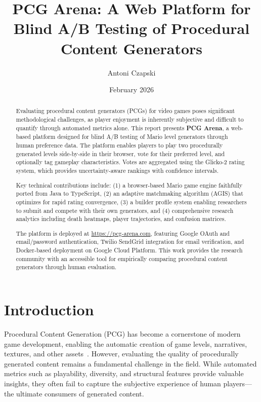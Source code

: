 \documentclass[11pt,a4paper]{article}
\title{PCG Arena: A Web Platform for Blind A/B Testing of Procedural Content Generators}
\author{Antoni Czapski}
\date{February 2026}
\theoremstyle{plain}
\theoremstyle{definition}
\theoremstyle{remark}
\begin{document}
\maketitle

\begin{abstract}
Evaluating procedural content generators (PCGs) for video games poses significant methodological challenges, as player enjoyment is inherently subjective and difficult to quantify through automated metrics alone. This report presents \textbf{PCG Arena}, a web-based platform designed for blind A/B testing of Mario level generators through human preference data. The platform enables players to play two procedurally generated levels side-by-side in their browser, vote for their preferred level, and optionally tag gameplay characteristics. Votes are aggregated using the Glicko-2 rating system, which provides uncertainty-aware rankings with confidence intervals.

Key technical contributions include: (1) a browser-based Mario game engine faithfully ported from Java to TypeScript, (2) an adaptive matchmaking algorithm (AGIS) that optimizes for rapid rating convergence, (3) a builder profile system enabling researchers to submit and compete with their own generators, and (4) comprehensive research analytics including death heatmaps, player trajectories, and confusion matrices.

The platform is deployed at \url{https://pcg-arena.com}, featuring Google OAuth and email/password authentication, Twilio SendGrid integration for email verification, and Docker-based deployment on Google Cloud Platform. This work provides the research community with an accessible tool for empirically comparing procedural content generators through human evaluation.
\end{abstract}

\tableofcontents
\newpage

\section{Introduction}
\label{sec:introduction}

Procedural Content Generation (PCG) has become a cornerstone of modern game development, enabling the automatic creation of game levels, narratives, textures, and other assets~\cite{summerville2018}. However, evaluating the quality of procedurally generated content remains a fundamental challenge in the field. While automated metrics such as playability, diversity, and structural features provide valuable insights, they often fail to capture the subjective experience of human players---the ultimate consumers of generated content.
\end{document}
